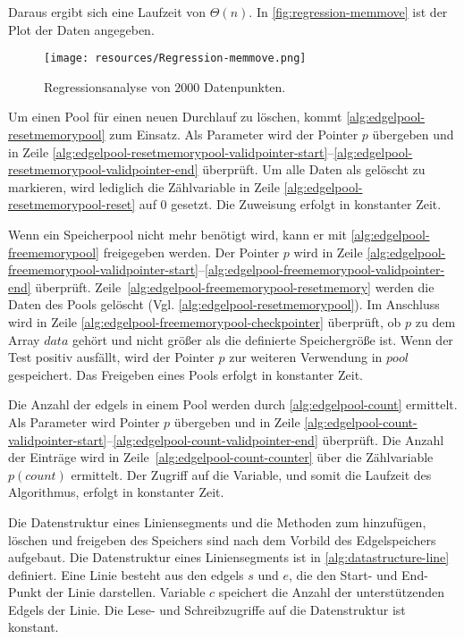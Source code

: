Daraus ergibt sich eine Laufzeit von $\Theta(n)$. In \autoref{fig:regression-memmove} ist der Plot der Daten angegeben.

\begin{figure}[!ht]
	\centering
	\texttt{[image: resources/Regression-memmove.png]}
	\caption{Regressionsanalyse von $2000$ Datenpunkten.}
	\label{fig:regression-memmove}
\end{figure}

Um einen Pool für einen neuen Durchlauf zu löschen, kommt \autoref{alg:edgelpool-resetmemorypool} zum Einsatz. Als
 Parameter wird der Pointer $p$ übergeben und in Zeile
 \ref{alg:edgelpool-resetmemorypool-validpointer-start}--\ref{alg:edgelpool-resetmemorypool-validpointer-end}
 überprüft. Um alle Daten als gelöscht zu markieren, wird lediglich die Zählvariable in Zeile
 \ref{alg:edgelpool-resetmemorypool-reset} auf $0$ gesetzt. Die Zuweisung erfolgt in konstanter Zeit.



Wenn ein Speicherpool nicht mehr benötigt wird, kann er mit \autoref{alg:edgelpool-freememorypool} freigegeben werden.
 Der Pointer $p$ wird in Zeile
 \ref{alg:edgelpool-freememorypool-validpointer-start}--\ref{alg:edgelpool-freememorypool-validpointer-end} überprüft.
 Zeile~\ref{alg:edgelpool-freememorypool-resetmemory} werden die Daten des Pools gelöscht
 (Vgl. \autoref{alg:edgelpool-resetmemorypool}). Im Anschluss wird in Zeile
 \ref{alg:edgelpool-freememorypool-checkpointer} überprüft, ob $p$ zu dem Array $\mathit{data}$ gehört und nicht größer
 als die definierte Speichergröße ist. Wenn der Test positiv ausfällt, wird der Pointer $p$ zur weiteren Verwendung in
 $\mathit{pool}$ gespeichert. Das Freigeben eines Pools erfolgt in konstanter Zeit.



Die Anzahl der \glspl{edgel} in einem Pool werden durch \autoref{alg:edgelpool-count} ermittelt. Als Parameter wird
 Pointer $p$ übergeben und in Zeile
 \ref{alg:edgelpool-count-validpointer-start}--\ref{alg:edgelpool-count-validpointer-end} überprüft. Die Anzahl der
 Einträge wird in Zeile~\ref{alg:edgelpool-count-counter} über die Zählvariable $p(\mathit{count})$ ermittelt. Der
 Zugriff auf die Variable, und somit die Laufzeit des Algorithmus, erfolgt in konstanter Zeit.



Die Datenstruktur eines Liniensegments und die Methoden zum hinzufügen, löschen und freigeben des Speichers sind nach
 dem Vorbild des Edgelspeichers aufgebaut. Die Datenstruktur eines Liniensegments ist in
 \autoref{alg:datastructure-line} definiert. Eine Linie besteht aus den \glspl{edgel} $s$ und $e$, die den Start- und
 End-Punkt der Linie darstellen. Variable $c$ speichert die Anzahl der unterstützenden Edgels der Linie. Die Lese- und
 Schreibzugriffe auf die Datenstruktur ist konstant.

